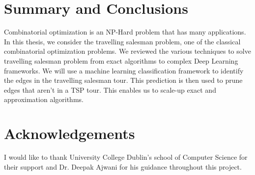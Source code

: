 \documentclass[]{UCD_CS_FYP_Report}
\begin{document}
\chapter{Summary and Conclusions}
Combinatorial optimization is an NP-Hard problem that has many applications. In this thesis, we consider the travelling salesman problem, one of the classical combinatorial optimization problems. We reviewed the various techniques to solve travelling salesman problem from exact algorithms to complex Deep Learning frameworks. We will use a machine learning classification framework to identify the edges in the travelling salesman tour. This prediction is then used to prune edges that aren’t in a TSP tour. This enables us to scale-up exact and approximation algorithms. 



%


\chapter*{Acknowledgements}
I would like to thank University College Dublin’s school of Computer Science for their support and Dr. Deepak Ajwani for his guidance throughout this project.


\printbibliography


\end{document}
